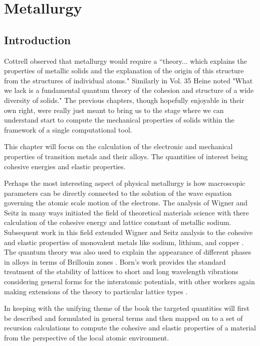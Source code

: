 \chapter{Metallurgy}
\label{chap:metallurgy}
\section{Introduction}
Cottrell observed that metallurgy would require a ``theory... which explains
the properties of metallic solids and the explanation of the origin of this
structure from the structures of individual atoms." Similarly in Vol. 35
Heine noted "What we lack is a fundamental quantum theory of the cohesion
and structure of a wide diversity of solids." The previous chapters,
though hopefully enjoyable in their own right, were really just meant to bring
us to the stage where we can understand start to compute 
the mechanical properties of solids within the framework 
of a single computational tool.

This chapter will focus on the calculation of the electronic and mechanical
properties of transition metals and their alloys. The quantities of interest
being cohesive energies and elastic properties.

Perhaps the most interesting aspect of physical metallurgy is how
macroscopic parameters can be directly connected to the solution of 
the wave equation governing the atomic scale motion of the electrons.
The analysis of Wigner and Seitz in many ways initiated the field
of theoretical materials science with there calculation of the cohesive
energy and lattice constant of metallic sodium\cite{wigner33, wigner34}.
Subsequent work in this field extended Wigner and Seitz analysis
to the cohesive and elastic properties of monovalent
metals like sodium, lithium, and copper \cite{fuchs36}. The quantum theory was
also used to explain the appearance of different phases in alloys in terms 
of Brillouin zones \cite{bethe29, bouckhaert36, owen33, jones34}. Born's work provides the standard
treatment of the stability of lattices to short and long wavelength
vibrations considering general forms for the interatomic potentials\cite{born40,born42},
with other workers again making extensions of the theory to particular
lattice types \cite{power41, nabarro52}.

In keeping with the unifying theme of the book the targeted quantities
will first be described and formulated in general terms and then mapped
on to a set of recursion calculations to compute the cohesive and elastic
properties of a material from the perspective of the local atomic environment.

